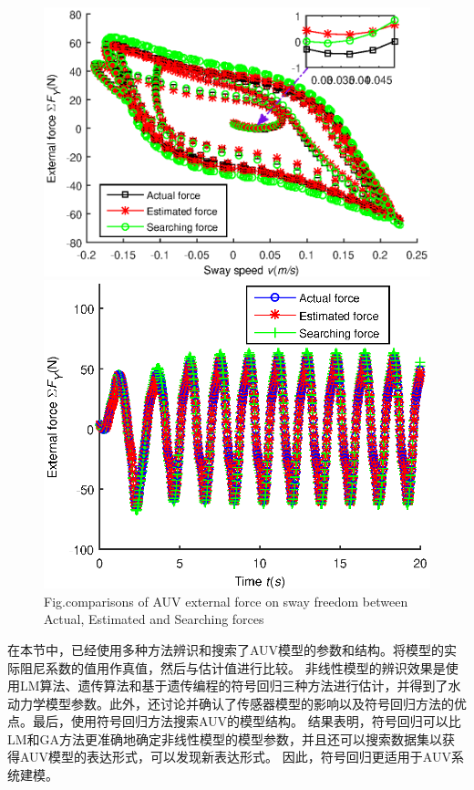 \begin{figure}[!htp]
\centering
\includegraphics[width=14cm]{figure/chap3/search_compare.eps}
\includegraphics[width=14cm]{figure/chap3/time-force_compare.eps}
\label{fig:chap3:F8}
 {Fig.}{comparisons of AUV external force on sway freedom between Actual, Estimated and Searching forces}
\end{figure}

在本节中，已经使用多种方法辨识和搜索了AUV模型的参数和结构。将模型的实际阻尼系数的值用作真值，然后与估计值进行比较。 非线性模型的辨识效果是使用LM算法、遗传算法和基于遗传编程的符号回归三种方法进行估计，并得到了水动力学模型参数。此外，还讨论并确认了传感器模型的影响以及符号回归方法的优点。最后，使用符号回归方法搜索AUV的模型结构。 结果表明，符号回归可以比LM和GA方法更准确地确定非线性模型的模型参数，并且还可以搜索数据集以获得AUV模型的表达形式，可以发现新表达形式。 因此，符号回归更适用于AUV系统建模。


